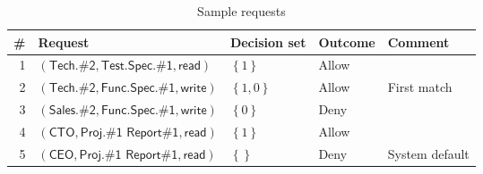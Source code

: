 \documentclass{article}
\newcommand{\set}[1]{\ensuremath{\left\{#1\right\}}} \newcommand{\sett}[1]{\ensuremath{\left\{\textit{#1}\right\}}} \newcommand{\tuple}[1]{\ensuremath{\left(#1\right)}} \newcommand{\tuplet}[1]{\ensuremath{\left(\textit{#1}\right)}}
\begin{document}
\begin{table*}[!ht]\centering
  {\renewcommand{\arraystretch}{1.25}
  \begin{tabular}{|r|l|l|l|l|}
    \hline
        \bf \# & \bf Request & \bf Decision set & \bf Outcome & \bf Comment \\
    \hline
    \hline
        1 & $(\textsf{Tech.\#2}, \textsf{Test.Spec.\#1}, \textsf{read})$ & $\set{1}$ & Allow & \\
        2 & $(\textsf{Tech.\#2}, \textsf{Func.Spec.\#1}, \textsf{write})$ & $\set{1,0}$ & Allow & First match \\
        3 & $(\textsf{Sales.\#2}, \textsf{Func.Spec.\#1}, \textsf{write})$ & $\set{0}$ & Deny & \\
        4 & $(\textsf{CTO}, \textsf{Proj.\#1 Report\#1}, \textsf{read})$ & $\set{1}$ & Allow & \\
        5 & $(\textsf{CEO}, \textsf{Proj.\#1 Report\#1}, \textsf{read})$ & $\set{}$ & Deny & System default \\
    \hline
  \end{tabular}}
\caption{Sample requests}\label{tbl:example_company_requests}
\end{table*}
\end{document}
